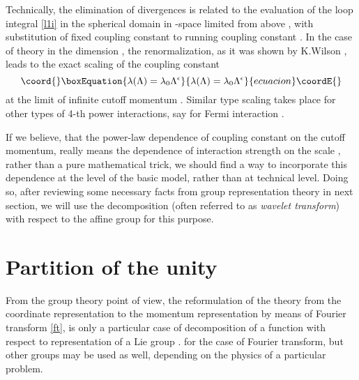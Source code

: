 \documentclass[a4paper,a4paper]{article}
\begin{document}
Technically, the elimination of divergences is related to the evaluation 
of the loop integral \eqref{l1i} in the spherical domain in \coordHE{}-space 
limited from 
above \coordHE{}, with substitution of fixed coupling 
constant \coordHE{} to running coupling constant \myHighlight{$\lambda=\lambda(\Lambda)$}\coordHE{}.
In the case of \coordHE{} theory in the dimension 
\coordHE{}, the renormalization, as it was 
shown by K.Wilson \cite{Wilson1973}, leads to the exact scaling of the coupling constant 
\begin{equation}\coord{}\boxEquation{
\lambda(\Lambda) = \lambda_0 \Lambda^\epsilon
\label{ws}
}{
\lambda(\Lambda) = \lambda_0 \Lambda^\epsilon
}{ecuacion}\coordE{}\end{equation}
at the limit of infinite cutoff momentum \myHighlight{$\Lambda\to\infty$}\coordHE{}. 
Similar type scaling takes place for other types of 4-th power 
interactions, say for Fermi interaction 
\coordHE{}. 

If we believe, that the power-law dependence of coupling constant 
on the cutoff 
momentum, really means the dependence of interaction strength on the 
scale \coordHE{}, rather than a pure mathematical trick, we should 
find a way to incorporate this dependence at the level of the basic model, 
rather than at technical level. Doing so, after reviewing some necessary 
facts from group representation theory in next section, we will use 
the decomposition (often referred to as {\em wavelet transform}) with 
respect to the affine group  for this purpose.  

\section{Partition of the unity} 
From the group theory 
point of view, 
the reformulation of the theory from the coordinate representation 
\coordHE{} to the momentum representation \coordHE{} by means  of 
Fourier transform \eqref{ft}, is only a particular case of decomposition 
of a function with respect to representation of a Lie group \coordHE{}. 
\coordHE{} for the case of Fourier transform, but other groups 
may be used as well, depending on the physics of a particular problem.
\end{document}
